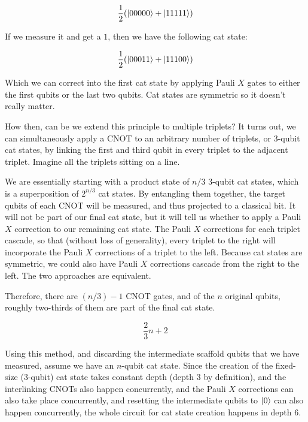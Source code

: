\documentclass{article}
\begin{document}
\begin{equation}
\frac{1}{2}(\left\vert{00000}\right\rangle + \left\vert{11111}\right\rangle)
\end{equation}

If we measure it and get a $1$, then we have the following cat state:

\begin{equation}
\frac{1}{2}(\left\vert{00011}\right\rangle + \left\vert{11100}\right\rangle)
\end{equation}

Which we can correct into the first cat state by applying Pauli $X$ gates
to either the first qubits or the last two qubits. Cat states are symmetric
so it doesn't really matter.

How then, can be we extend this principle to multiple triplets? It turns out,
we can simultaneously apply a CNOT to an arbitrary number of triplets, or
$3$-qubit cat states, by linking the first and third qubit in every triplet
to the adjacent triplet. Imagine all the triplets sitting on a line.

We are essentially starting with a product state of $n/3$ $3$-qubit cat
states, which is a superposition of $2^{n/3}$ cat states.
By entangling them together, the target qubits of each CNOT will be measured,
and thus projected to a classical bit. It will not be part of our
final cat state, but it will tell us whether to apply a Pauli $X$
correction to our remaining cat state. The Pauli $X$ corrections for each
triplet cascade, so that (without loss of generality), every triplet to the
right will incorporate the Pauli $X$ corrections of a triplet to the left.
Because cat states are symmetric, we could also have Pauli $X$ corrections
cascade from the right to the left. The two approaches are equivalent.

Therefore, there are $(n/3)-1$ CNOT gates, and of the $n$ original qubits,
roughly two-thirds of them are part of the final cat state.

\begin{equation}
\frac{2}{3}n + 2
\end{equation}

Using this method, and discarding the intermediate scaffold qubits that we
have measured, assume we have an $n$-qubit cat state. Since the creation
of the fixed-size ($3$-qubit) cat state takes constant depth (depth 3 by
definition), and the interlinking CNOTs also happen concurrently, and the
Pauli $X$ corrections can also take place concurrently, and resetting the
intermediate qubits to $\left\vert{0}\right\rangle$ can also happen concurrently, the whole
circuit for cat state creation happens in depth $6$.
\end{document}
